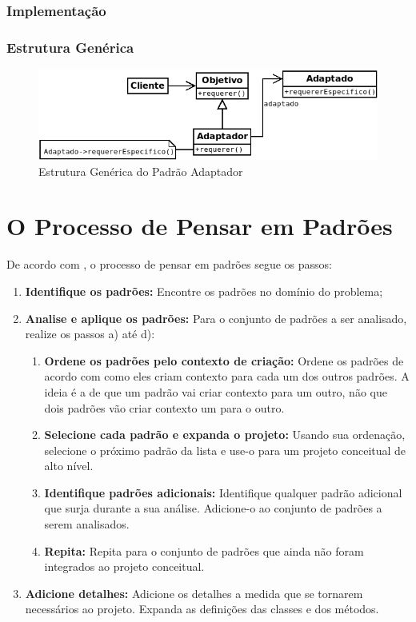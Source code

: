 \subsubsection{Implementação}
\subsubsection{Estrutura Genérica}

\begin{figure}[h]
\begin{center}
\includegraphics[scale=0.6]{adaptador.png}
\caption{Estrutura Genérica do Padrão Adaptador}\label{fig:adaptador}
\end{center}
\end{figure}

\section{O Processo de Pensar em Padrões}

De acordo com , o processo de pensar em padrões segue os passos:
\begin{enumerate}
\item \textbf{Identifique os padrões:} Encontre os padrões no domínio do problema;
\item \textbf{Analise e aplique os padrões:} Para o conjunto de padrões a ser analisado, realize os passos a) até d):
\begin{enumerate}
\item \textbf{Ordene os padrões pelo contexto de criação:} Ordene os padrões de acordo com como eles criam contexto para cada um dos outros padrões. A ideia é a de que um padrão vai criar contexto para um outro, não que dois padrões vão criar contexto um para o outro.
\item \textbf{Selecione cada padrão e expanda o projeto:} Usando sua ordenação, selecione o próximo padrão da lista e use-o para um projeto conceitual de alto nível.
\item \textbf{Identifique padrões adicionais:} Identifique qualquer padrão adicional que surja durante a sua análise. Adicione-o ao conjunto de padrões a serem analisados.
\item \textbf{Repita:} Repita para o conjunto de padrões que ainda não foram integrados ao projeto conceitual.
\end{enumerate}
\item \textbf{Adicione detalhes:} Adicione os detalhes a medida que se tornarem necessários ao projeto. Expanda as definições das classes e dos métodos.
\end{enumerate}

